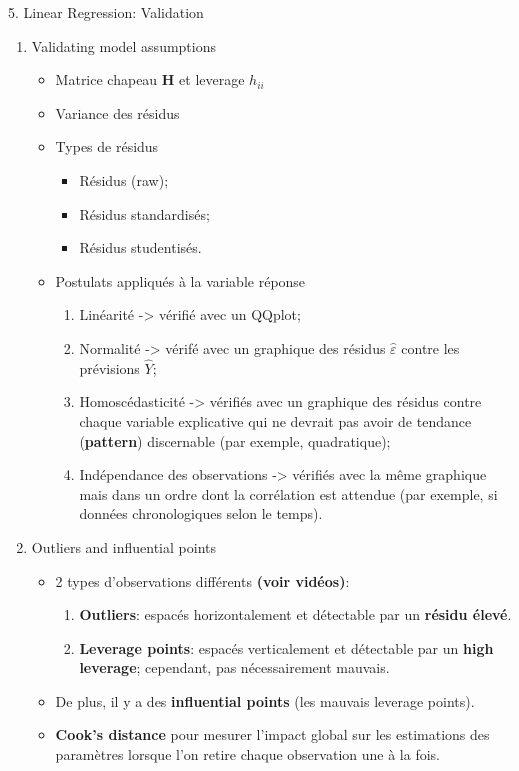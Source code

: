 \documentclass[12pt, titlepage, french]{report}
\begin{document}
\begin{CHPT_SUMM}{5. Linear Regression:  Validation}
\begin{enumerate}
	\item	Validating model assumptions
	\begin{itemize}
		\item	Matrice chapeau $\bm{H}$ et leverage $h_{ii}$
		\item	Variance des résidus
		\item	Types de résidus
		\begin{itemize}
			\item	Résidus (raw);
			\item	Résidus standardisés;
			\item	Résidus studentisés.
		\end{itemize}
		\item	Postulats appliqués à la variable réponse
		\begin{enumerate}
			\item	Linéarité -> vérifié avec un QQplot;
			\item	Normalité -> vérifé avec un graphique des résidus $\hat{\varepsilon}$ contre les prévisions $\hat{Y}$;
			\item	Homoscédasticité -> vérifiés avec un graphique des résidus contre chaque variable explicative qui ne devrait pas avoir de tendance (\textbf{pattern}) discernable (par exemple, quadratique);
			\item	Indépendance des observations -> vérifiés avec la même graphique mais dans un ordre dont la corrélation est attendue (par exemple, si données chronologiques selon le temps).
		\end{enumerate}
	\end{itemize}
	\item	Outliers and influential points
	\begin{itemize}
		\item	2 types d'observations différents \textbf{(voir vidéos)}:
		\begin{enumerate}
			\item	\textbf{Outliers}: espacés horizontalement et détectable par un \textbf{résidu élevé}.
			\item	\textbf{Leverage points}: espacés verticalement et détectable par un \textbf{high leverage}; cependant, pas nécessairement mauvais.
		\end{enumerate}
		\item	De plus, il y a des \textbf{influential points} (les mauvais leverage points).
		\item	\textbf{Cook's distance} pour mesurer l'impact global sur les estimations des paramètres lorsque l'on retire chaque observation une à la fois.

\end{itemize}
\end{enumerate}
\end{CHPT_SUMM}
\end{document}
